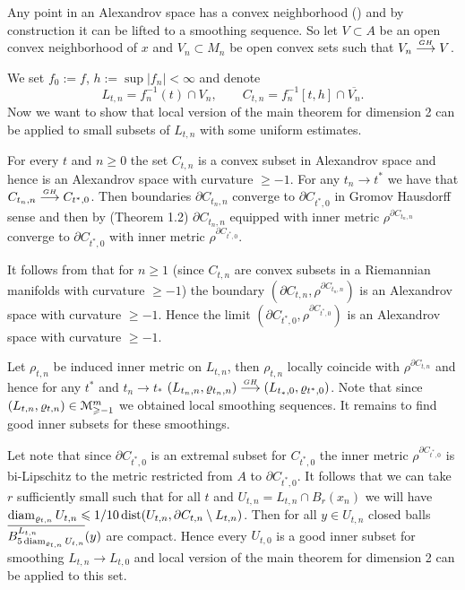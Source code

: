 \documentclass[a4paper,10pt]{article}
\begin{document}
Any point  in an Alexandrov space
has a convex neighborhood (\cite{convexity}) and by
construction  it can be lifted  to a smoothing sequence.
So let 
$V\subset A$ be an open  convex
neighborhood of $x$ and
$ V_n\subset M_n$
be open convex sets such that
$V_n  \stackrel{\hbox{\tiny $GH$}}{\longrightarrow}   V$.

We set $f_0:=f$, $h:=\sup |f_n|<\infty$
and denote 
$$L_{t,n}=f_n^{-1}(t)\cap V_n,\qquad
C_{t,n}=f_n^{-1}[t,h]\cap \overline{V_n}.$$
Now we want to show that local version of the main theorem  for dimension 2 can be applied to small subsets of $L_{t,n}$ with some uniform estimates.



For every $t$ and $n\ge 0$ the set
$C_{t,n}$ is 
 a
 convex subset in
  Alexandrov space 
 and hence is an Alexandrov space 
 with curvature $\ge -1$.
For any $t_n\to t^*$ we have that
$C_{t_n,n}     \stackrel{\hbox{\tiny $GH$}}{\longrightarrow}    C_{t^*,0} $. 
Then boundaries  $\partial C_{t_n,n}  $
  converge to $\partial C_{t^*,0}  $ in
Gromov Hausdorff sense and then by  
  \cite{petrunin-QG} (Theorem 1.2)
 $\partial C_{t_n, n}  $ equipped with inner metric
 $\rho^{\partial C_{t_n,n}}$ converge to
 $\partial C_{t^*,0}  $ with inner metric
 $\rho^{\partial C_{t^*,0}}$.
 
 
 It follows from \cite{AKP} that
 for $n\ge 1$
  (since $C_{t,n}$ are
 convex subsets in a Riemannian manifolds with curvature $\ge -1$)
  the boundary
$(\partial C_{t,n}, \rho^{\partial C_{t_n,n}}) $ is
an Alexandrov space 
 with curvature $\ge -1$. Hence the limit
$(\partial C_{t^*,0}, \rho^{\partial C_{t^*,0}}) $ is
an Alexandrov space 
 with curvature $\ge -1$.

Let $\rho_{t,n}$ be induced inner metric on $L_{t,n}$,
then $\rho_{t,n}$ locally coincide with
$\rho^{\partial C_{t,n}}$ and hence 
for any $t^*$ and $t_n\to t_*$
$(L_{t_n,n}, \varrho_{t_n,n})\stackrel{\hbox{\tiny $GH$}}{\longrightarrow} (L_{t_*,0},\varrho_{t^*,0} )$.
Note that since $(L_{t,n}, \varrho_{t,n})\in\mathcal M_{\geqslant -1}^m$
we obtained
local smoothing sequences. It remains to find good inner
subsets for these smoothings.

Let  note that since 
$\partial C_{t^*,0}$
is an extremal subset for
$C_{t^*,0}$
 the inner metric
$ \rho^{\partial C_{t^*,0}} $ is bi-Lipschitz to
the metric restricted from $A$ to
$\partial C_{t^*,0}$.
It follows that
we can take $r$ sufficiently small
such that for all $t$ and
$U_{t,n}=L_{t,n}\cap B_{r}(x_n)$
we will have
$\operatorname{diam}_{\varrho_{t,n}} U_{t,n}\leqslant 1/10 \operatorname{dist}   (U_{t,n},\partial C_{t,n}\setminus L_{t,n})$. Then for
all $y\in U_{t,n}$ closed balls
$\overline {B^{L_{t,n}}_{5\operatorname{diam}_{\varrho_{t,n}} U_{t,n}}}(y) $ are compact.
Hence every $U_{t,0}$ is a good inner subset for 
smoothing  $L_{t,n}\to L_{t,0}$
and local version of the main theorem for dimension 2
can be applied to this set.
\end{document}
